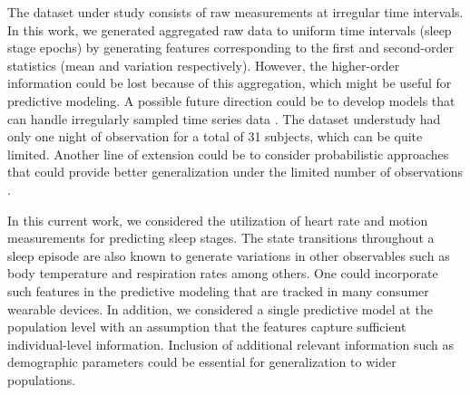 \documentclass[12pt]{article}
\begin{document}
The dataset under study consists of raw measurements at irregular time intervals. In this work, we generated aggregated raw data to uniform time intervals (sleep stage epochs) by generating features corresponding to the first and second-order statistics (mean and variation respectively). However, the higher-order information could be lost because of this aggregation, which might be useful for predictive modeling. A possible future direction could be to develop models that can handle irregularly sampled time series data \citep{sun2020review}. The dataset understudy had only one night of observation for a total of 31 subjects, which can be quite limited. Another line of extension could be to consider probabilistic approaches that could provide better generalization under the limited number of observations \citep{fortunato2017bayesian}.  

In this current work, we considered the utilization of heart rate and motion measurements for predicting sleep stages. The state transitions throughout a sleep episode are also known to generate variations in other observables such as body temperature and respiration rates among others. One could incorporate such features in the predictive modeling that are tracked in many consumer wearable devices. In addition, we considered a single predictive model at the population level with an assumption that the features capture sufficient individual-level information. Inclusion of additional relevant information such as demographic parameters could be essential for generalization to wider populations.  





\end{document}

